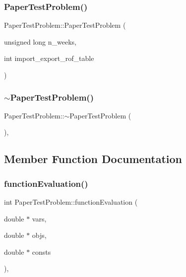 \subsubsection{\texorpdfstring{Paper\+Test\+Problem()}{PaperTestProblem()}}
{\footnotesize\ttfamily Paper\+Test\+Problem\+::\+Paper\+Test\+Problem (\begin{DoxyParamCaption}\item[{unsigned long}]{n\+\_\+weeks,  }\item[{int}]{import\+\_\+export\+\_\+rof\+\_\+table }\end{DoxyParamCaption})}

\mbox{\label{classPaperTestProblem_a571a92266d4c58ebc27e20391f7ad81b}} 
\subsubsection{\texorpdfstring{$\sim$\+Paper\+Test\+Problem()}{~PaperTestProblem()}}
{\footnotesize\ttfamily Paper\+Test\+Problem\+::$\sim$\+Paper\+Test\+Problem (\begin{DoxyParamCaption}{ }\end{DoxyParamCaption})\hspace{0.3cm}{\ttfamily [override]}, {\ttfamily [default]}}



\subsection{Member Function Documentation}
\mbox{\label{classPaperTestProblem_a6db78df74d40f69a750b164caaca75c7}} 
\subsubsection{\texorpdfstring{function\+Evaluation()}{functionEvaluation()}}
{\footnotesize\ttfamily int Paper\+Test\+Problem\+::function\+Evaluation (\begin{DoxyParamCaption}\item[{double $\ast$}]{vars,  }\item[{double $\ast$}]{objs,  }\item[{double $\ast$}]{consts }\end{DoxyParamCaption})\hspace{0.3cm}{\ttfamily [override]}, {\ttfamily [virtual]}}

